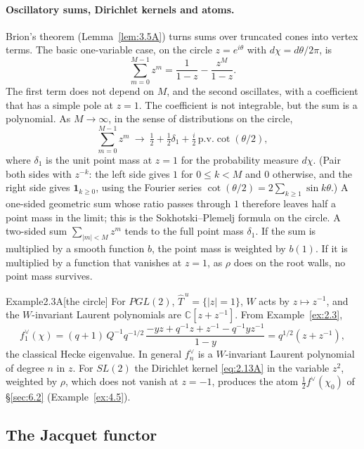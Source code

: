 \documentclass[12pt,letterpaper]{article}
\numberwithin{equation}{section}
\theoremstyle{plain}
\theoremstyle{remark}
\theoremstyle{plain}
\theoremstyle{definition}
\theoremstyle{remark}
\theoremstyle{remark}
\newcommand{\Thu}{\widehat{T}^{\,u}}
\newcommand{\one}{\mathbf 1}
\begin{document}
\paragraph{Oscillatory sums, Dirichlet kernels and atoms.} Brion's theorem (Lemma~\ref{lem:3.5A}) turns sums over truncated cones into vertex terms. The basic one-variable case, on the circle $z=e^{i\theta}$ with $d\chi=d\theta/2\pi$, is
\[
\sum_{m=0}^{M-1}z^m=\frac1{1-z}-\frac{z^M}{1-z}.
\]
The first term does not depend on $M$, and the second oscillates, with a coefficient that has a simple pole at $z=1$. The coefficient is not integrable, but the sum is a polynomial. As $M\to\infty$, in the sense of distributions on the circle,
\begin{equation}\tag{2.13A}\label{eq:2.13A}
\sum_{m=0}^{M-1}z^m\ \longrightarrow\ \tfrac12+\tfrac12\delta_1+\tfrac i2\,\mathrm{p.v.}\cot(\theta/2),
\end{equation}
where $\delta_1$ is the unit point mass at $z=1$ for the probability measure $d\chi$. (Pair both sides with $z^{-k}$: the left side gives $1$ for $0\le k<M$ and $0$ otherwise, and the right side gives $\one_{k\ge0}$, using the Fourier series $\cot(\theta/2)=2\sum_{k\ge1}\sin k\theta$.) A one-sided geometric sum whose ratio passes through $1$ therefore leaves half a point mass in the limit; this is the Sokhotski--Plemelj formula on the circle. A two-sided sum $\sum_{|m|<M}z^m$ tends to the full point mass $\delta_1$. If the sum is multiplied by a smooth function $b$, the point mass is weighted by $b(1)$. If it is multiplied by a function that vanishes at $z=1$, as $\rho$ does on the root walls, no point mass survives.

\begin{fixedrem}{Example}{2.3A}[the circle]\label{ex:2.3A}
For $PGL(2)$, $\Thu=\{|z|=1\}$, $W$ acts by $z\mapsto z^{-1}$, and the $W$-invariant Laurent polynomials are $\mathbb{C}[z+z^{-1}]$. From Example~\ref{ex:2.3},
\[
f_1^\vee(\chi)=(q+1)\,Q^{-1}q^{-1/2}\,\frac{-yz+q^{-1}z+z^{-1}-q^{-1}yz^{-1}}{1-y}=q^{1/2}(z+z^{-1}),
\]
the classical Hecke eigenvalue. In general $f_n^\vee$ is a $W$-invariant Laurent polynomial of degree $n$ in $z$. For $SL(2)$ the Dirichlet kernel \eqref{eq:2.13A} in the variable $z^2$, weighted by $\rho$, which does not vanish at $z=-1$, produces the atom $\frac12f^\vee(\chi_0)$ of \S\ref{sec:6.2} (Example~\ref{ex:4.5}).
\end{fixedrem}

\subsection{The Jacquet functor}\label{sec:2.4}
\end{document}
